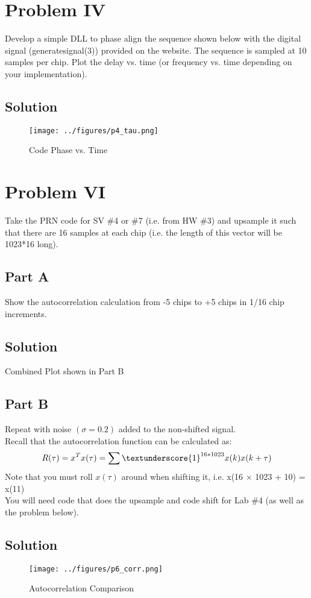 \documentclass{article}
\begin{document}
\section*{Problem IV}
Develop a simple DLL to phase align the sequence shown below with the digital signal
(generate\textunderscore signal(3)) provided on the website. The sequence is sampled at 10 samples per
chip. Plot the delay vs. time (or frequency vs. time depending on your implementation).
\subsection*{Solution}
\begin{figure}[H]
    \centering
    \texttt{[image: ../figures/p4\_tau.png]}\label{fig:p4_tau}
    \caption{Code Phase vs. Time}
\end{figure}

\section*{Problem VI}
Take the PRN code for SV \#4 or \#7 (i.e. from HW \#3) and upsample it such that there are
16 samples at each chip (i.e. the length of this vector will be 1023*16 long).

\subsection*{Part A}
Show the autocorrelation calculation from -5 chips to +5 chips in 1/16 chip increments.
\subsection*{Solution}
Combined Plot shown in Part B
\subsection*{Part B}
Repeat with noise $(\sigma=0.2)$ added to the non-shifted signal.\\
Recall that the autocorrelation function can be calculated as:
\begin{gather*}
    R(\tau) = x^T x(\tau) = \sum\textunderscore {1}^{16*1023}x(k)x(k+\tau)
\end{gather*}
Note that you must roll $x(\tau)$ around when shifting it, i.e. x(16 × 1023 + 10) = x(11)\\
You will need code that does the upsample and code shift for Lab \#4 (as well as the
problem below).
\subsection*{Solution}
\begin{figure}[H]
    \centering
    \texttt{[image: ../figures/p6\_corr.png]}\label{fig:p6_corr}
    \caption{Autocorrelation Comparison}
\end{figure}
\end{document}
